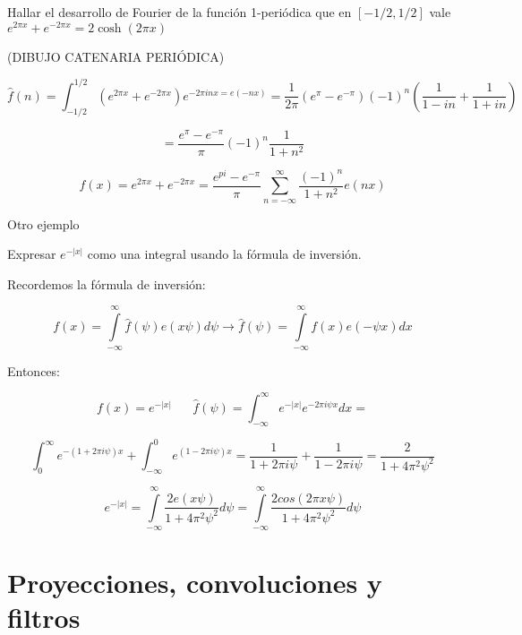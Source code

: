 \begin{example}

	Hallar el desarrollo de Fourier de la función 1-periódica que en $[-1/2, 1/2]$ vale $e^{2\pi x} + e^{-2\pi x } = 2 \cosh (2 \pi x)$

	(DIBUJO CATENARIA PERIÓDICA)


	$$\hat{f}(n) = \int ^{1/2}_{-1/2} \left( e^{2 \pi x} + e ^{-2 \pi x} \right) e ^{-2 \pi i n x = e (-nx)} = \frac{1}{2 \pi} (e^{\pi} - e^{-\pi}) (-1)^{n} \left( \frac{1}{1-in} + \frac{1}{1 + in} \right) $$

	$$ = \frac{e^{\pi} - e^{-\pi}}{\pi} (-1)^{n} \frac{1}{1 + n^2}$$

	$$ f(x) = e ^{2 \pi x} + e^{-2 \pi x} = \frac{e^{pi} - e^{-\pi}}{\pi} \sum_{n = -\infty}^{\infty} \frac{(-1)^n}{1 + n^2} e(nx) $$

\end{example}












\begin{example}{Otro ejemplo}

Expresar $e^{-|x|}$ como una integral usando la fórmula de inversión.


Recordemos la fórmula de inversión:

$$ f(x) = \int\limits^{\infty}_{-\infty} \hat{f}(\psi) e(x\psi) d\psi \rightarrow \hat{f}(\psi) = \int\limits^{\infty}_{-\infty} f(x) e(-\psi x) dx$$

Entonces:

$$f(x) = e^{-|x|} \;\;\;\;\;\; \hat{f}(\psi) = \int_{-\infty}^{\infty} e^{-|x|} e ^{-2 \pi i \psi x} dx = $$

$$ \int_{0}^{\infty} e ^{-(1 + 2 \pi i \psi) x} + \int_{-\infty}^{0} e ^{(1 - 2 \pi i \psi) x} = \frac{1}{1 + 2\pi i \psi} + \frac{1}{1-2 \pi i \psi} = \frac{2}{1 + 4 \pi^2 \psi^2}$$


$$e^{-|x|} = \int\limits_{-\infty}^{\infty} \frac{2 e (x \psi)}{1 + 4 \pi^2 \psi^2} d \psi = \int\limits^{\infty}_{-\infty} \frac{2 cos(2 \pi x \psi)}{1 + 4 \pi^2 \psi^2} d\psi $$ 

\end{example}

\section{Proyecciones, convoluciones y filtros}

